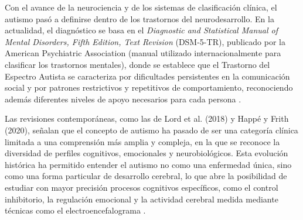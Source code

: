 \documentclass{book}
\begin{document}
Con el avance de la neurociencia y de los sistemas de clasificación clínica, el autismo pasó a definirse dentro de los trastornos del neurodesarrollo. En la actualidad, el diagnóstico se basa en el \textit{Diagnostic and Statistical Manual of Mental Disorders, Fifth Edition, Text Revision} (DSM-5-TR), publicado por la American Psychiatric Association (manual utilizado internacionalmente para clasificar los trastornos mentales), donde se establece que el Trastorno del Espectro Autista se caracteriza por dificultades persistentes en la comunicación social y por patrones restrictivos y repetitivos de comportamiento, reconociendo además diferentes niveles de apoyo necesarios para cada persona \cite{APA2022}.

Las revisiones contemporáneas, como las de Lord et al. (2018) y Happé y Frith (2020), señalan que el concepto de autismo ha pasado de ser una categoría clínica limitada a una comprensión más amplia y compleja, en la que se reconoce la diversidad de perfiles cognitivos, emocionales y neurobiológicos. Esta evolución histórica ha permitido entender el autismo no como una enfermedad única, sino como una forma particular de desarrollo cerebral, lo que abre la posibilidad de estudiar con mayor precisión procesos cognitivos específicos, como el control inhibitorio, la regulación emocional y la actividad cerebral medida mediante técnicas como el electroencefalograma \cite{Lord2018, Happe2020}.
\end{document}
